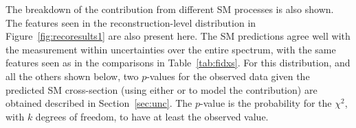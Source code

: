 The breakdown of the contribution from different SM processes is also
shown.
The features seen in the reconstruction-level distribution in
Figure~\ref{fig:recoresults1} are also
present here.
The SM predictions agree well with the measurement within
uncertainties over the
entire \mFourL{} spectrum, with the same features seen as in the
comparisons in Table~\ref{tab:fidxs}.
For this distribution, and all the others shown below, two $p$-values for the observed data given the predicted SM cross-section
(using either \SHERPA{} or \POWHEG{} to model the \qqFourL{} contribution) are obtained
described in Section~\ref{sec:unc}.
The $p$-value is the probability for the
$\chi^2$, with $k$ degrees of
freedom,  to have at
least the observed value.

